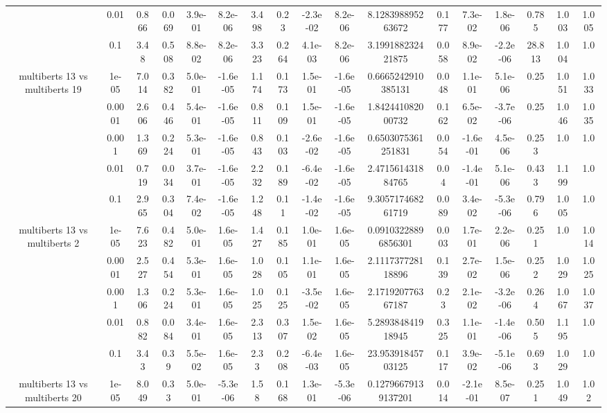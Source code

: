 \begin{tabular}{|c|c|c|c|c|c|c|c|c|c|c|c|c|c|c|c|c|}
 & 0.01 & 0.866 & 0.069 & 3.9e-01 & 8.2e-06 & 3.498 & 0.23 & -2.3e-02 & 8.2e-06 & 8.128398895263672 & 0.177 & 7.3e-02 & 1.8e-06 & 0.785 & 1.003 & 1.005 \\
 & 0.1 & 3.48 & 0.508 & 8.8e-02 & 8.2e-06 & 3.323 & 0.264 & 4.1e-03 & 8.2e-06 & 3.199188232421875 & 0.058 & 8.9e-02 & -2.2e-06 & 28.813 & 1.004 & 1.0 \\
\hline
\multirow{5}{*}{multiberts 13 vs multiberts 19} & 1e-05 & 7.014 & 0.382 & 5.0e-01 & -1.6e-05 & 1.174 & 0.173 & 1.5e-01 & -1.6e-05 & 0.6665242910385131 & 0.048 & 1.1e-01 & 5.1e-06 & 0.25 & 1.051 & 1.033 \\
 & 0.0001 & 2.606 & 0.446 & 5.4e-01 & -1.6e-05 & 0.811 & 0.109 & 1.5e-01 & -1.6e-05 & 1.842441082000732 & 0.162 & 6.5e-02 & -3.7e-06 & 0.25 & 1.046 & 1.035 \\
 & 0.001 & 1.369 & 0.224 & 5.3e-01 & -1.6e-05 & 0.843 & 0.103 & -2.6e-02 & -1.6e-05 & 0.6503075361251831 & 0.054 & -1.6e-01 & 4.5e-06 & 0.253 & 1.0 & 1.0 \\
 & 0.01 & 0.719 & 0.034 & 3.7e-01 & -1.6e-05 & 2.232 & 0.189 & -6.4e-02 & -1.6e-05 & 2.471561431884765 & 0.04 & -1.4e-01 & 5.1e-06 & 0.433 & 1.199 & 1.0 \\
 & 0.1 & 2.965 & 0.304 & 7.4e-02 & -1.6e-05 & 1.248 & 0.11 & -1.4e-02 & -1.6e-05 & 9.305717468261719 & 0.089 & 3.4e-02 & -5.3e-06 & 0.796 & 1.005 & 1.0 \\
\hline
\multirow{5}{*}{multiberts 13 vs multiberts 2} & 1e-05 & 7.623 & 0.482 & 5.0e-01 & 1.6e-05 & 1.427 & 0.185 & 1.0e-01 & 1.6e-05 & 0.09103228896856301 & 0.003 & 1.7e-01 & 2.2e-06 & 0.251 & 1.0 & 1.014 \\
 & 0.0001 & 2.527 & 0.454 & 5.3e-01 & 1.6e-05 & 1.028 & 0.105 & 1.1e-01 & 1.6e-05 & 2.111737728118896 & 0.139 & 2.7e-02 & 1.5e-06 & 0.252 & 1.029 & 1.025 \\
 & 0.001 & 1.306 & 0.224 & 5.3e-01 & 1.6e-05 & 1.025 & 0.125 & -3.5e-02 & 1.6e-05 & 2.171920776367187 & 0.23 & 2.1e-02 & -3.2e-06 & 0.264 & 1.067 & 1.037 \\
 & 0.01 & 0.882 & 0.084 & 3.4e-01 & 1.6e-05 & 2.313 & 0.307 & 1.5e-02 & 1.6e-05 & 5.289384841918945 & 0.325 & 1.1e-01 & -1.4e-06 & 0.505 & 1.195 & 1.0 \\
 & 0.1 & 3.43 & 0.39 & 5.5e-02 & 1.6e-05 & 2.33 & 0.208 & -6.4e-03 & 1.6e-05 & 23.95391845703125 & 0.117 & 3.9e-02 & -5.1e-06 & 0.693 & 1.029 & 1.0 \\
\hline
\multirow{5}{*}{multiberts 13 vs multiberts 20} & 1e-05 & 8.049 & 0.33 & 5.0e-01 & -5.3e-06 & 1.58 & 0.168 & 1.3e-01 & -5.3e-06 & 0.12796679139137201 & 0.014 & -2.1e-01 & 8.5e-07 & 0.251 & 1.049 & 1.02 \\

\end{tabular}
